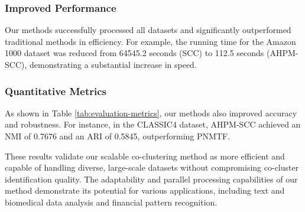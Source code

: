 \subsubsection{Improved Performance} Our methods successfully processed all datasets and significantly outperformed traditional methods in efficiency. For example, the running time for the Amazon 1000 dataset was reduced from 64545.2 seconds (SCC) to 112.5 seconds (AHPM-SCC), demonstrating a substantial increase in speed.

\subsubsection{Quantitative Metrics} As shown in Table \ref{tab:evaluation-metrics}, our methods also improved accuracy and robustness. For instance, in the CLASSIC4 dataset, AHPM-SCC achieved an NMI of 0.7676 and an ARI of 0.5845, outperforming PNMTF.

These results validate our scalable co-clustering method as more efficient and capable of handling diverse, large-scale datasets without compromising co-cluster identification quality. The adaptability and parallel processing capabilities of our method demonstrate its potential for various applications, including text and biomedical data analysis and financial pattern recognition.
